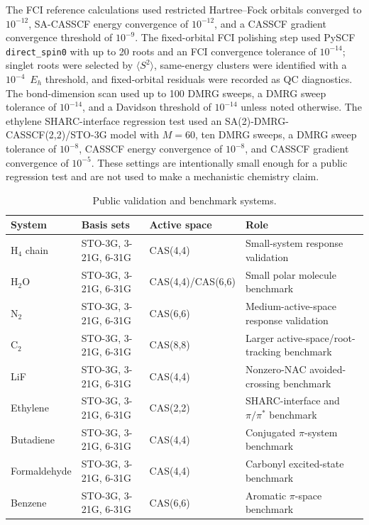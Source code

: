 \documentclass[journal=jctcce,manuscript=article]{achemso}
\begin{document}
The FCI reference calculations used restricted Hartree--Fock orbitals
converged to $10^{-12}$, SA-CASSCF energy convergence of $10^{-12}$, and a
CASSCF gradient convergence threshold of $10^{-9}$.  The fixed-orbital FCI
polishing step used PySCF \texttt{direct\_spin0} with up to 20 roots
and an FCI convergence tolerance of $10^{-14}$; singlet roots were selected by
$\langle S^2\rangle$, same-energy clusters were identified with a
$10^{-4}$~$E_h$ threshold, and fixed-orbital residuals were recorded as QC
diagnostics.  The bond-dimension
scan used up to 100 DMRG sweeps, a DMRG
sweep tolerance of $10^{-14}$, and a Davidson threshold of $10^{-14}$ unless
noted otherwise.  The ethylene SHARC-interface regression test used an
SA(2)-DMRG-CASSCF(2,2)/STO-3G model with $M=60$, ten DMRG sweeps, a DMRG
sweep tolerance of $10^{-8}$, CASSCF energy convergence of $10^{-8}$, and
CASSCF gradient convergence of $10^{-5}$.  These settings are intentionally
small enough for a public regression test and are not used to make a
mechanistic chemistry claim.

\begin{table}[h]
\centering
\small
\caption{Public validation and benchmark systems.}
\label{tab:systems}
\begin{tabular}{P{0.18\textwidth}P{0.23\textwidth}P{0.18\textwidth}P{0.31\textwidth}}
\toprule
System & Basis sets & Active space & Role \\
\midrule
H$_4$ chain & STO-3G, 3-21G, 6-31G & CAS(4,4) & Small-system response validation \\
H$_2$O & STO-3G, 3-21G, 6-31G & CAS(4,4)/CAS(6,6) & Small polar molecule benchmark \\
N$_2$ & STO-3G, 3-21G, 6-31G & CAS(6,6) & Medium-active-space response validation \\
C$_2$ & STO-3G, 3-21G, 6-31G & CAS(8,8) & Larger active-space/root-tracking benchmark \\
LiF & STO-3G, 3-21G, 6-31G & CAS(4,4) & Nonzero-NAC avoided-crossing benchmark \\
Ethylene & STO-3G, 3-21G, 6-31G & CAS(2,2) & SHARC-interface and $\pi/\pi^\ast$ benchmark \\
Butadiene & STO-3G, 3-21G, 6-31G & CAS(4,4) & Conjugated $\pi$-system benchmark \\
Formaldehyde & STO-3G, 3-21G, 6-31G & CAS(4,4) & Carbonyl excited-state benchmark \\
Benzene & STO-3G, 3-21G, 6-31G & CAS(6,6) & Aromatic $\pi$-space benchmark \\
\bottomrule
\end{tabular}
\end{table}
\end{document}
